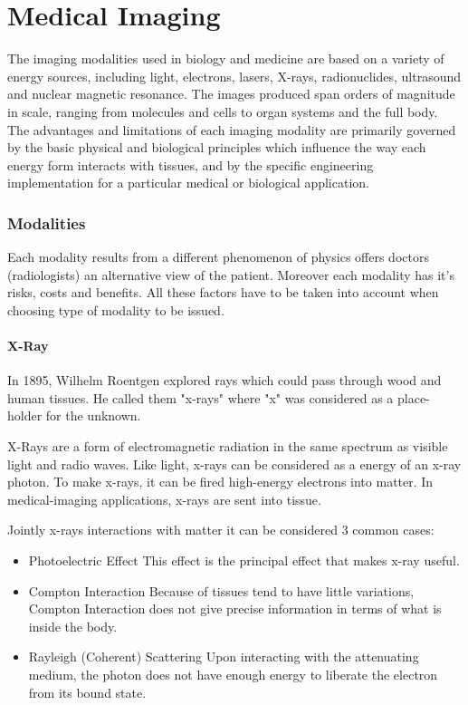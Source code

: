 \chapter{Medical Imaging}
\label{ch:rworks}

The imaging modalities used in biology and medicine are based on a variety of energy sources, including light, electrons, lasers, X-rays, radionuclides, ultrasound and nuclear magnetic resonance. The images produced span orders of magnitude in scale, ranging from molecules and cells to organ systems and the full body. The advantages and limitations of each imaging modality are primarily governed by the basic physical and biological principles which influence the way each energy form interacts with tissues, and by the specific engineering implementation for a particular medical or biological application.

\subsection{Modalities}
Each modality results from a different phenomenon of physics offers doctors (radiologists) an alternative view of the patient. Moreover each modality has it's risks, costs and benefits. All these factors have to be taken into account when choosing type of modality to be issued.

\subsubsection{X-Ray}
In 1895, Wilhelm Roentgen explored rays which could pass through wood and human tissues. He called them "x-rays" where "x" was considered as a place-holder for the unknown.

X-Rays are a form of electromagnetic radiation in the same spectrum as visible light and radio waves. Like light, x-rays can be considered as a energy of an x-ray photon. To make x-rays, it can be fired high-energy electrons into matter. In medical-imaging applications, x-rays are sent into tissue. 

Jointly x-rays interactions with matter it can be considered 3 common cases:
\begin{itemize}
    \item Photoelectric Effect
    \newline This effect is the principal effect that makes x-ray useful.
    \item Compton Interaction
    \newline Because of tissues tend to have little variations, Compton Interaction does not give precise information in terms of what is inside the body. 
    \item Rayleigh (Coherent) Scattering
    \newline Upon interacting with the attenuating medium, the photon does not have enough energy to liberate the electron from its bound state.
\end{itemize}

